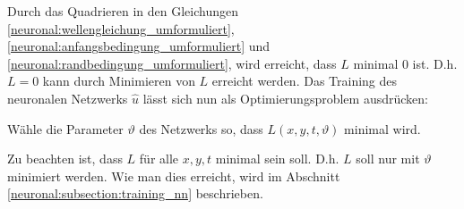 Durch das Quadrieren in den Gleichungen \eqref{neuronal:wellengleichung_umformuliert}, \eqref{neuronal:anfangsbedingung_umformuliert} und \eqref{neuronal:randbedingung_umformuliert}, wird erreicht, dass \( L \) minimal 0 ist.
D.h. \( L = 0 \) kann durch Minimieren von \( L \) erreicht werden.
Das Training des neuronalen Netzwerks \( \hat{u} \) lässt sich nun als Optimierungsproblem ausdrücken:
\begin{aufgabe}
Wähle die Parameter \( \vartheta \) des Netzwerks so, dass \( L(x, y, t, \vartheta) \) minimal wird.
\end{aufgabe}

Zu beachten ist, dass \( L \) für alle \( x, y, t \) minimal sein soll.
D.h. \( L \) soll nur mit \( \vartheta \) minimiert werden.
Wie man dies erreicht, wird im Abschnitt \ref{neuronal:subsection:training_nn} beschrieben.




